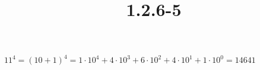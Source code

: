 \documentclass{article}
\title{1.2.6-5}
\begin{document}
\maketitle

$11^4 = (10+1)^4 = 1 \cdot 10^4 + 4 \cdot 10^3 + 6 \cdot 10^2 + 4 \cdot 10^1 + 1 \cdot 10^0 = 14641$
\end{document}
